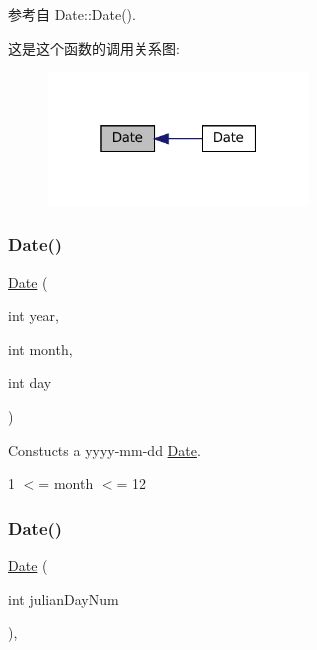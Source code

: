参考自 Date\+::\+Date().

这是这个函数的调用关系图\+:
\nopagebreak
\begin{figure}[H]
\begin{center}
\leavevmode
\includegraphics[width=196pt]{classmuduo_1_1Date_aff49fc2cda4491ff4457ca481bb8edf9_icgraph}
\end{center}
\end{figure}
\mbox{\label{classmuduo_1_1Date_a9bc88fd74d1980ea8e7a86db85b5a3e7}} 
\subsubsection{\texorpdfstring{Date()}{Date()}\hspace{0.1cm}{\footnotesize\ttfamily [2/4]}}
{\footnotesize\ttfamily \hyperlink{classmuduo_1_1Date}{Date} (\begin{DoxyParamCaption}\item[{int}]{year,  }\item[{int}]{month,  }\item[{int}]{day }\end{DoxyParamCaption})}

Constucts a yyyy-\/mm-\/dd \hyperlink{classmuduo_1_1Date}{Date}.

1 $<$= month $<$= 12 \mbox{\label{classmuduo_1_1Date_aeadd49d9f6ac56d1cf22bd65367f4fd0}} 
\subsubsection{\texorpdfstring{Date()}{Date()}\hspace{0.1cm}{\footnotesize\ttfamily [3/4]}}
{\footnotesize\ttfamily \hyperlink{classmuduo_1_1Date}{Date} (\begin{DoxyParamCaption}\item[{int}]{julian\+Day\+Num }\end{DoxyParamCaption})\hspace{0.3cm}{\ttfamily [inline]}, {\ttfamily [explicit]}}

